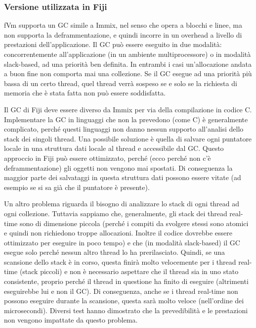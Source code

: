 

\subsubsection{Versione utilizzata in Fiji}
fVm supporta un GC simile a Immix, nel senso che opera a blocchi e linee, ma non supporta la deframmentazione, e quindi incorre in un overhead a livello di prestazioni dell'applicazione. Il GC può essere eseguito in due modalità: concorrentemente all'applicazione (in un ambiente multiprocessore) o in modalità slack-based, ad una priorità ben definita. In entrambi i casi un'allocazione andata a buon fine non comporta mai una collezione. Se il GC esegue ad una priorità più bassa di un certo thread, quel thread verrà sospeso se e solo se la richiesta di memoria che è stata fatta non può essere soddisfatta.

Il GC di Fiji deve essere diverso da Immix per via della compilazione in codice C. Implementare la GC in linguaggi che non la prevedono (come C) è generalmente complicato, perché questi linguaggi non danno nessun supporto all'analisi dello stack dei singoli thread. Una possibile soluzione è quella di salvare ogni puntatore locale in una struttura dati locale al thread e accessibile dal GC. Questo approccio in Fiji può essere ottimizzato, perché (ecco perché non c'è deframmentazione) gli oggetti non vengono mai spostati. Di conseguenza la maggior parte dei salvataggi in questa struttura dati possono essere vitate (ad esempio se si sa già che il puntatore è presente). 

Un altro problema riguarda il bisogno di analizzare lo stack di ogni thread ad ogni collezione. Tuttavia sappiamo che, generalmente, gli stack dei thread real-time sono di dimensione piccola (perché i compiti da svolgere stessi sono atomici e quindi non richiedono troppe allocazioni. Inoltre il codice dovrebbe essere ottimizzato per eseguire in poco tempo) e che (in modalità slack-based) il GC esegue solo perché nessun altro thread lo ha prerilasciato. Quindi, se una scansione dello stack è in corso, questa finirà molto velocemente per i thread real-time (stack piccoli) e non è necessario aspettare che il thread sia in uno stato consistente, proprio perché il thread in questione ha finito di eseguire (altrimenti eseguirebbe lui e non il GC). Di conseguenza, anche se i thread real-time non possono eseguire durante la scansione, questa sarà molto veloce (nell'ordine dei microsecondi). Diversi test hanno dimostrato che la prevedibilità e le prestazioni non vengono impattate da questo problema.

